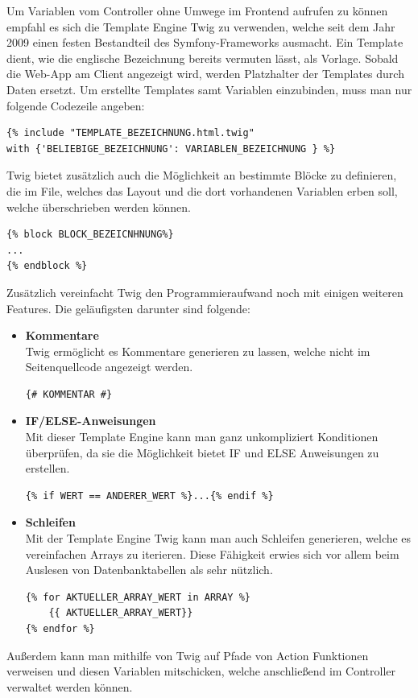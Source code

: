 Um Variablen vom Controller ohne Umwege im Frontend aufrufen zu können empfahl es sich die Template Engine Twig zu verwenden, welche seit dem Jahr 2009 einen festen Bestandteil des Symfony-Frameworks ausmacht. Ein Template dient, wie die englische Bezeichnung bereits vermuten lässt, als Vorlage. Sobald die Web-App am Client angezeigt wird, werden Platzhalter der Templates durch Daten ersetzt. 
Um erstellte Templates samt Variablen einzubinden, muss man nur folgende Codezeile angeben:
	\lstset{language = php}
  	\begin{lstlisting}
{% include "TEMPLATE_BEZEICHNUNG.html.twig" 
with {'BELIEBIGE_BEZEICHNUNG': VARIABLEN_BEZEICHNUNG } %}
  	\end{lstlisting}
  	Twig bietet zusätzlich auch die Möglichkeit an bestimmte Blöcke zu definieren, die im File, welches das Layout und die dort vorhandenen Variablen erben soll, welche überschrieben werden können.
	\lstset{language = php}
  	\begin{lstlisting}
{% block BLOCK_BEZEICNHNUNG%}
...
{% endblock %}
	\end{lstlisting}
Zusätzlich vereinfacht Twig den Programmieraufwand noch mit einigen weiteren Features. Die geläufigsten darunter sind folgende:
\begin{itemize}
    \item \textbf{Kommentare}\\
Twig ermöglicht es Kommentare generieren zu lassen, welche nicht im Seitenquellcode angezeigt werden. 
\lstset{language = html}
  	\begin{lstlisting}
{# KOMMENTAR #}
	\end{lstlisting}
    \item \textbf{IF/ELSE-Anweisungen}\\
Mit dieser Template Engine kann man ganz unkompliziert Konditionen überprüfen, da sie die Möglichkeit bietet IF und ELSE Anweisungen zu erstellen.
\lstset{language = php}
  	\begin{lstlisting}
{% if WERT == ANDERER_WERT %}...{% endif %}
	\end{lstlisting}
    \item \textbf{Schleifen}\\
Mit der Template Engine Twig kann man auch Schleifen generieren, welche es vereinfachen Arrays zu iterieren. Diese Fähigkeit erwies sich vor allem beim Auslesen von Datenbanktabellen als sehr nützlich.
\lstset{language = php}
  	\begin{lstlisting}
{% for AKTUELLER_ARRAY_WERT in ARRAY %}
	{{ AKTUELLER_ARRAY_WERT}}
{% endfor %}
	\end{lstlisting}
  \end{itemize}  
Außerdem kann man mithilfe von Twig auf Pfade von Action Funktionen verweisen und diesen Variablen mitschicken, welche anschließend im Controller verwaltet werden können.

